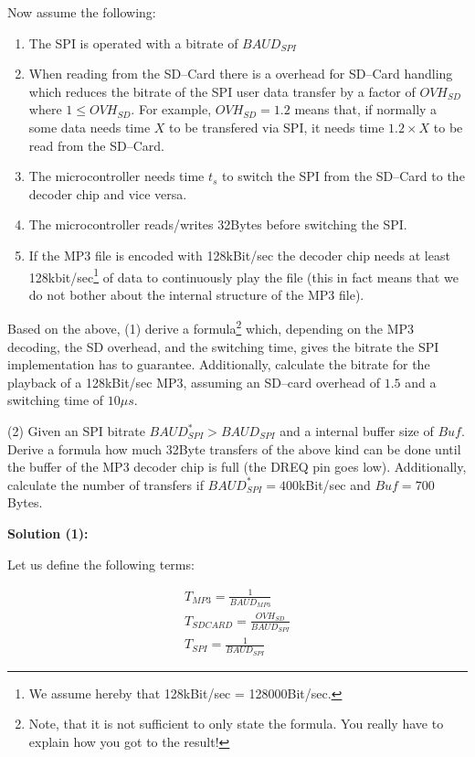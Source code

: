 \documentclass[12pt,a4paper,titlepage,oneside]{article}
\begin{document}
Now assume the following:
\begin{enumerate}
\item The SPI is operated with a bitrate of $\mathit{BAUD}_{SPI}$
\item When reading from the SD--Card there is a overhead for SD--Card
     handling which reduces the bitrate of the SPI user data transfer
     by a factor of $\mathit{OVH}_{SD}$ where $1 \le \mathit{OVH}_{SD}$.
For example, $\mathit{OVH}_{SD}=1.2$ means that, if normally a some data needs
     time $X$ to be transfered via SPI, it needs time $1.2\times X$ to be
     read from the SD--Card.
\item The microcontroller needs time $t_s$ to switch the SPI from the
     SD--Card to the decoder chip and vice versa.
\item The microcontroller reads/writes 32Bytes before switching the SPI.
\item If the MP3 file is encoded with 128kBit/sec the decoder chip
     needs at least 128kbit/sec\footnote{We assume hereby that
     128kBit/sec = 128000Bit/sec.} of data to continuously play the
     file (this in fact means that we do not bother about the internal
     structure of the MP3 file).




\end{enumerate}


Based on the above, (1) derive a formula\footnote{Note, that it is not
     sufficient to only state the formula.
You really have to explain how you got to the result!} which,
     depending on the MP3 decoding, the SD overhead, and the switching
     time, gives the bitrate the SPI implementation has to guarantee.
Additionally, calculate the bitrate for the playback of a 128kBit/sec
     MP3, assuming an SD--card overhead of $1.5$ and a switching time
     of $10\mu s$.

(2) Given an SPI bitrate $\mathit{BAUD}_{SPI}^{*}>\mathit{BAUD}_{SPI}$
     and a internal buffer size of $\mathit{Buf}$.
Derive a formula how much 32Byte transfers of the above kind can be
     done until the buffer of the MP3 decoder chip is full (the DREQ
     pin goes low).
Additionally, calculate the number of transfers if
     $\mathit{BAUD}_{SPI}^{*}=400$kBit/sec and  $\mathit{Buf} =
     700$Bytes.

{\bf Solution (1):}

Let us define the following terms:

\begin{equation}
\begin{aligned}
T_{MP3} = \frac{1}{BAUD_{MP3}} \\
T_{SDCARD} = \frac{OVH_{SD}}{BAUD_{SPI}} \\
T_{SPI} = \frac{1}{BAUD_{SPI}}
\end{aligned}
\end{equation}
\end{document}
